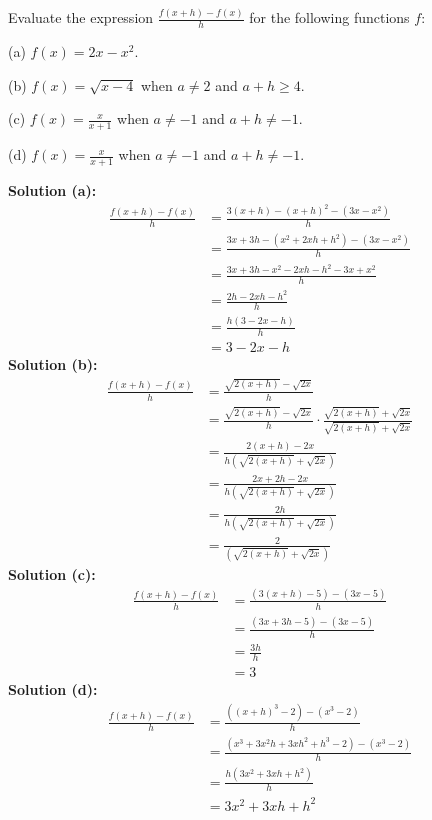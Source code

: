\begin{tcolorbox}[title=Problem 20, breakable]
    Evaluate the expression $\frac{f(x + h) - f(x)}{h}$
        for the following functions $f$:

    (a) $f(x) = 2x - x^2$.

    (b) $f(x) = \sqrt{x - 4}$ when $a \ne 2$ and $a + h \ge 4$.

    (c) $f(x) = \frac{x}{x + 1}$ when $a \ne -1$ and $a + h \ne -1$.

    (d) $f(x) = \frac{x}{x + 1}$ when $a \ne -1$ and $a + h \ne -1$.
\end{tcolorbox}

\textbf{Solution (a):}
\begin{align*}
    \frac{f(x + h) - f(x)}{h} 
        &= \frac{3(x + h) - (x + h)^2 - (3x - x^2)}{h} \\
        &= \frac{3x + 3h - (x^2 + 2xh + h^2) - (3x - x^2)}{h} \\
        &= \frac{3x  + 3h - x^2 - 2xh - h^2 - 3x  + x^2}{h} \\
        &= \frac{2h - 2xh - h^2}{h} \\
        &= \frac{h(3 - 2x - h)}{h} \\
        &= 3 - 2x - h
\end{align*}
\textbf{Solution (b):}
\begin{align*}
    \frac{f(x + h) - f(x)}{h} 
        &= \frac{\sqrt{2(x + h)} - \sqrt{2x}}{h} \\
        &= \frac{\sqrt{2(x + h)} - \sqrt{2x}}{h} \cdot \frac{\sqrt{2(x + h)} + \sqrt{2x}}{\sqrt{2(x + h)} + \sqrt{2x}} \\
        &= \frac{2(x + h) - 2x}{h(\sqrt{2(x + h)} + \sqrt{2x})} \\
        &= \frac{2x + 2h - 2x}{h(\sqrt{2(x + h)} + \sqrt{2x})} \\
        &= \frac{2h}{h(\sqrt{2(x + h)} + \sqrt{2x})} \\
        &= \frac{2}{(\sqrt{2(x + h)} + \sqrt{2x})} 
\end{align*}
\textbf{Solution (c):}
\begin{align*}
    \frac{f(x + h) - f(x)}{h} 
        &= \frac{(3(x + h) - 5) - (3x - 5)}{h} \\
        &= \frac{(3x + 3h - 5) - (3x - 5)}{h} \\
        &= \frac{3h}{h} \\
        &= 3
\end{align*}
\textbf{Solution (d):}
\begin{align*}
    \frac{f(x + h) - f(x)}{h} 
        &= \frac{((x + h)^3 - 2) - (x^3 - 2)}{h} \\
        &= \frac{(x^3 + 3x^2 h + 3x h^2 + h^3 - 2) - (x^3  - 2)}{h} \\
        &= \frac{h(3x^2 + 3xh + h^2)}{h} \\
        &= 3x^2 + 3xh + h^2
\end{align*}

